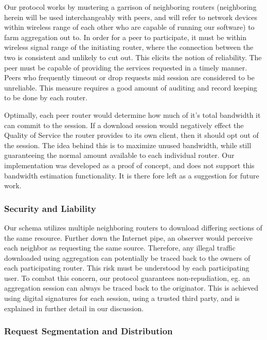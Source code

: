 \documentclass[12pt]{article}
\begin{document}
			Our protocol works by mustering a garrison of neighboring routers (neighboring herein will be used interchangeably with peers, and will refer to network devices within wireless range of each other who are capable of running our software) to farm aggregation out to. In order for a peer to participate, it must be within wireless signal range of the initiating router, where the connection between the two is consistent and unlikely to cut out. This elicits the notion of reliability. The peer must be capable of providing the services requested in a timely manner. Peers who frequently timeout or drop requests mid session are considered to be unreliable. This measure requires a good amount of auditing and record keeping to be done by each router.

			Optimally, each peer router would determine how much of it's total bandwidth it can commit to the session. If a download session would negatively effect the Quality of Service the router provides to its own client, then it should opt out of the session. The idea behind this is to maximize unused bandwidth, while still guaranteeing the normal amount available to each individual router. Our implementation was developed as a proof of concept, and does not support this bandwidth estimation functionality. It is there fore left as a suggestion for future work.

		\subsubsection{Security and Liability}

			Our schema utilizes multiple neighboring routers to download differing sections of the same resource. Further down the Internet pipe, an observer would perceive each neighbor as requesting the same source. Therefore, any illegal traffic downloaded using aggregation can potentially be traced back to the owners of each participating router. This risk must be understood by each participating user. To combat this concern, our protocol guarantees non-repudiation, eg. an aggregation session can always be traced back to the originator. This is achieved using digital signatures for each session, using a trusted third party, and is explained in further detail in our discussion.

		\subsubsection{Request Segmentation and Distribution}
\end{document}
